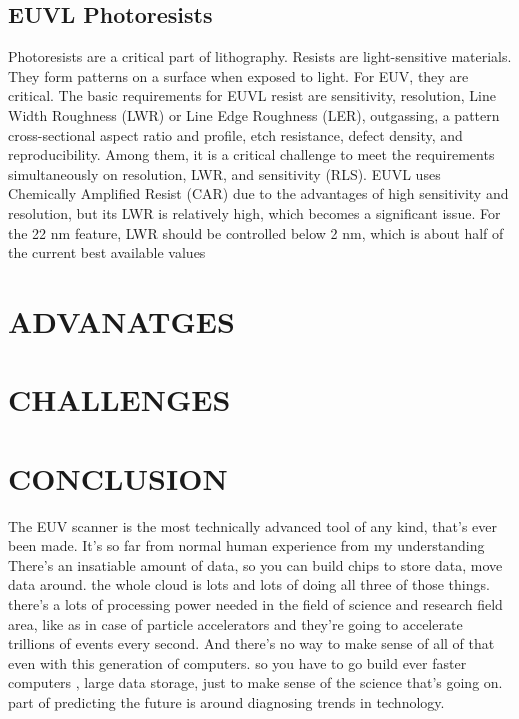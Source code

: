 \documentclass[12pt,a4paper]{report}
\begin{document}
\section{EUVL Photoresists}

Photoresists are a critical part of lithography. Resists are 
light-sensitive materials. 
They form patterns on a surface when exposed to light. For EUV, 
they are critical.
The basic requirements for EUVL resist are sensitivity, 
resolution, Line Width Roughness 
(LWR) or Line Edge Roughness (LER), outgassing, a pattern 
cross-sectional aspect ratio 
and profile, etch resistance, defect density, and 
reproducibility. Among them, 
it is a critical challenge to meet the requirements 
simultaneously on resolution, 
LWR, and sensitivity (RLS). EUVL uses Chemically Amplified 
Resist (CAR) due to 
the advantages of high sensitivity and resolution, but its 
LWR is relatively high, 
which becomes a significant issue. For the 22 nm feature, 
LWR should be 
controlled below 2 nm, which is about half of the current 
best available values

\chapter{ADVANATGES}

\chapter{CHALLENGES}

\chapter{CONCLUSION}
The EUV scanner is the most technically advanced tool of any kind, that's ever been made. It's so far from
normal human experience from my understanding
There's an insatiable amount of data, so you can build chips to store data, move data around. the whole cloud is lots
and lots of doing all three of those things. 
there's a lots of processing power needed in the field of science and research field area, like as in case 
of  particle
accelerators and they're going to accelerate trillions of events every second. And there's no way to make 
sense of all of that even with this generation of computers. so you have to go build ever faster computers
, large data storage, just to make sense of the science that's going on. part of predicting the future is around
diagnosing trends in technology.
\end{document}
